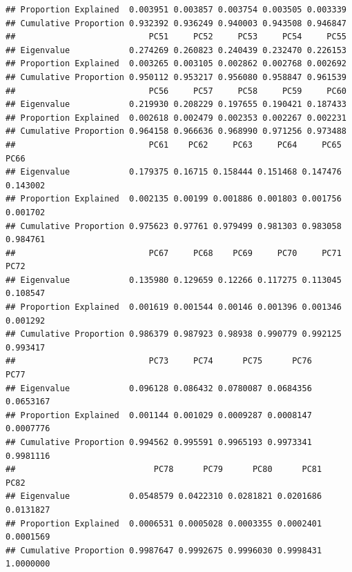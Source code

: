 \documentclass[]{article}
\newenvironment{Shaded}{\begin{snugshade}}{\end{snugshade}}
\newcommand{\CommentTok}[1]{\textcolor[rgb]{0.56,0.35,0.01}{\textit{#1}}}
\newcommand{\KeywordTok}[1]{\textcolor[rgb]{0.13,0.29,0.53}{\textbf{#1}}}
\newcommand{\NormalTok}[1]{#1}
\newcommand{\OperatorTok}[1]{\textcolor[rgb]{0.81,0.36,0.00}{\textbf{#1}}}
\begin{document}
\begin{verbatim}
## Proportion Explained  0.003951 0.003857 0.003754 0.003505 0.003339
## Cumulative Proportion 0.932392 0.936249 0.940003 0.943508 0.946847
##                           PC51     PC52     PC53     PC54     PC55
## Eigenvalue            0.274269 0.260823 0.240439 0.232470 0.226153
## Proportion Explained  0.003265 0.003105 0.002862 0.002768 0.002692
## Cumulative Proportion 0.950112 0.953217 0.956080 0.958847 0.961539
##                           PC56     PC57     PC58     PC59     PC60
## Eigenvalue            0.219930 0.208229 0.197655 0.190421 0.187433
## Proportion Explained  0.002618 0.002479 0.002353 0.002267 0.002231
## Cumulative Proportion 0.964158 0.966636 0.968990 0.971256 0.973488
##                           PC61    PC62     PC63     PC64     PC65     PC66
## Eigenvalue            0.179375 0.16715 0.158444 0.151468 0.147476 0.143002
## Proportion Explained  0.002135 0.00199 0.001886 0.001803 0.001756 0.001702
## Cumulative Proportion 0.975623 0.97761 0.979499 0.981303 0.983058 0.984761
##                           PC67     PC68    PC69     PC70     PC71     PC72
## Eigenvalue            0.135980 0.129659 0.12266 0.117275 0.113045 0.108547
## Proportion Explained  0.001619 0.001544 0.00146 0.001396 0.001346 0.001292
## Cumulative Proportion 0.986379 0.987923 0.98938 0.990779 0.992125 0.993417
##                           PC73     PC74      PC75      PC76      PC77
## Eigenvalue            0.096128 0.086432 0.0780087 0.0684356 0.0653167
## Proportion Explained  0.001144 0.001029 0.0009287 0.0008147 0.0007776
## Cumulative Proportion 0.994562 0.995591 0.9965193 0.9973341 0.9981116
##                            PC78      PC79      PC80      PC81      PC82
## Eigenvalue            0.0548579 0.0422310 0.0281821 0.0201686 0.0131827
## Proportion Explained  0.0006531 0.0005028 0.0003355 0.0002401 0.0001569
## Cumulative Proportion 0.9987647 0.9992675 0.9996030 0.9998431 1.0000000
\end{verbatim}

\begin{Shaded}
\end{Shaded}
\end{document}
